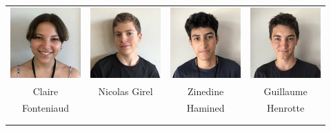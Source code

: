 \begin{center}
\begin{tabular}{cccc}
\includegraphics[angle=270,origin=c, width=27mm]{eleves/Fonteniaud Claire.JPG} &
\includegraphics[angle=270,origin=c, width=27mm]{eleves/Girel Nicolas.JPG} &
\includegraphics[angle=270,origin=c, width=27mm]{eleves/Hamimed Zinedine.JPG} &
\includegraphics[angle=270,origin=c, width=27mm]{eleves/Henrotte Guillaume.JPG} \\
Claire & Nicolas Girel & Zinedine  & Guillaume \\ Fonteniaud & & Hamined & Henrotte \\ \\ \\ 


\end{tabular}
\end{center}
